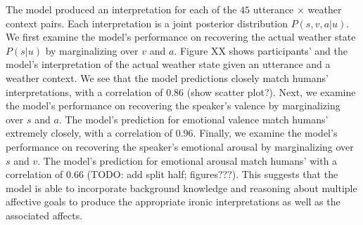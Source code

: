 \documentclass[10pt,letterpaper]{article}
\begin{document}
The model produced an interpretation for each of the $45$ utterance $\times$ weather context pairs. Each interpretation is a joint posterior distribution $P(s, v, a | u)$. We first examine the model's performance on recovering the actual weather state $P(s | u)$ by marginalizing over $v$ and $a$. Figure XX shows participants' and the model's interpretation of the actual weather state given an utterance and a weather context. We see that the model predictions closely match humans' interpretations, with a correlation of $0.86$ (show scatter plot?). 
Next, we examine the model's performance on recovering the speaker's valence by marginalizing over $s$ and $a$. The model's prediction for emotional valence match humans' extremely closely, with a correlation of $0.96$.
Finally, we examine the model's performance on recovering the speaker's emotional arousal by marginalizing over $s$ and $v$. The model's prediction for emotional arousal match humans' with a correlation of $0.66$ (TODO: add split half; figures???). 
This suggests that the model is able to incorporate background knowledge and reasoning about multiple affective goals to produce the appropriate ironic interpretations as well as the associated affects. 
\end{document}
